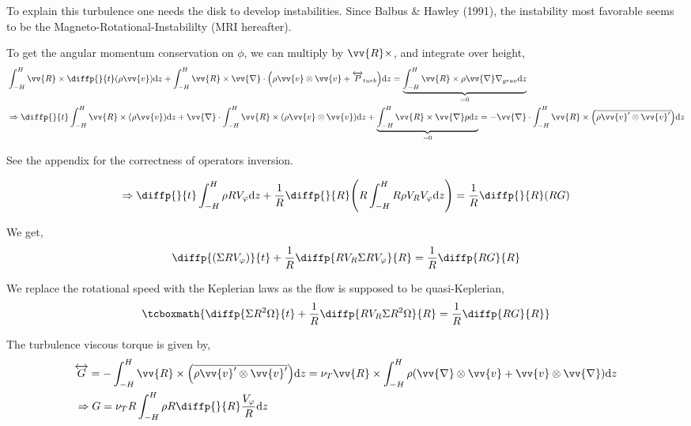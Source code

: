 \documentclass[10pt,a4paper,english,draft]{article}
\let\originalleft\left
\let\originalright\right
\renewcommand{\left}{\mathopen{}\mathclose\bgroup\originalleft}
\renewcommand{\right}{\aftergroup\egroup\originalright}
\begin{document}

To explain this turbulence one needs the disk to develop instabilities. Since
Balbus \& Hawley (1991), the instability most favorable seems to be the
Magneto-Rotational-Instabililty (MRI hereafter).


To get the angular momentum conservation on $\phi$, we can multiply by $\vv{R} \times$, and integrate over height,
\begin{align*}
    &\int_{-H}^H \vv{R} \times \diffp{}{t}(\rho \vv{v}) \d{z} +
    \int_{-H}^H \vv{R} \times \vv{\nabla} \cdot \left(\rho \vv{v} \otimes \vv{v} + \tens{P}_{turb}\right) \d{z} =
    \underbrace{\int_{-H}^H \vv{R} \times \rho \vv{\nabla} \nabla_{grav} \d{z}}_{= 0} \\
    &\Rightarrow \diffp{}{t} \int_{-H}^H \vv{R} \times (\rho \vv{v}) \d{z} +
    \vv{\nabla} \cdot \int_{-H}^H \vv{R} \times \left( \rho \vv{v} \otimes \vv{v} \right) \d{z} +
    \underbrace{\int_{-H}^H \vv{R} \times \vv{\nabla} p \d{z}}_{= 0} =
    - \vv{\nabla} \cdot \int_{-H}^H \vv{R} \times \left(\overline{\rho \vv{v}' \otimes \vv{v}'}\right) \d{z}
\end{align*}

See the appendix for the correctness of operators inversion.


\begin{equation*}
    \Rightarrow \diffp{}{t} \int_{-H}^H \rho R V_\varphi \d{z} + \frac{1}{R} \diffp{}{R} \left( R \int_{-H}^H R \rho V_R V_\varphi \d{z} \right) =
    \frac{1}{R} \diffp{}{R} \left( R G \right)
\end{equation*}

We get,
\begin{equation*}
    \diffp{\left(\Sigma R V_\varphi\right)}{t} + \frac{1}{R} \diffp{R V_R \Sigma R V_\varphi}{R} = \frac{1}{R} \diffp{RG}{R}
\end{equation*}

We replace the rotational speed with the Keplerian laws as the flow is supposed to be quasi-Keplerian,
\begin{equation}
    \label{eq:alpha_moment}
    \tcboxmath{
        \diffp{\Sigma R^2 \Omega}{t} + \frac{1}{R} \diffp{R V_R \Sigma R^2 \Omega}{R} = \frac{1}{R} \diffp{RG}{R}
    }
\end{equation}

The turbulence viscous torque is given by,
\begin{align*}
    & \overleftrightarrow{G} = - \int_{-H}^H \vv{R} \times \left( \overline{\rho \vv{v}' \otimes \vv{v}'} \right) \d{z} =
    \nu_T \vv{R} \times \int_{-H}^H \rho \left(\vv{\nabla} \otimes \vv{v} + \vv{v} \otimes \vv{\nabla} \right) \d{z} \\
    & \Rightarrow G = \nu_T R \int_{-H}^{H} \rho R \diffp{}{R} \frac{V_\varphi}{R} \d{z}
\end{align*}
\end{document}
